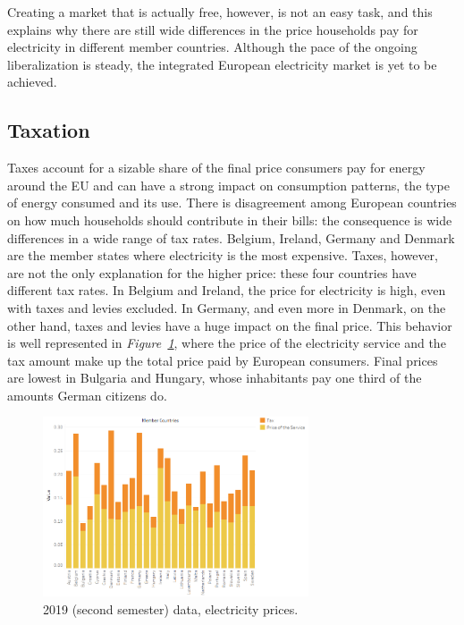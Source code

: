\documentclass[a4paper,12pt]{book}
\begin{document}
Creating a market that is actually free, however, is not an easy task, and this explains why there are still wide differences in the price households pay for electricity in different member countries. Although the pace of the ongoing liberalization is steady, the integrated European electricity market is yet to be achieved. \\

\subsection{Taxation}

Taxes account for a sizable share of the final price consumers pay for energy around the EU and can have a strong impact on consumption patterns, the type of energy consumed and its use. There is disagreement among European countries on how much households should contribute in their bills: the consequence is wide differences in a wide range of tax rates. Belgium, Ireland, Germany and Denmark are the member states where electricity is the most expensive. Taxes, however, are not the only explanation for the higher price: these four countries have different tax rates. In Belgium and Ireland, the price for electricity is high, even with taxes and levies excluded. In Germany, and even more in Denmark, on the other hand, taxes and levies have a huge impact on the final price. This behavior is well represented in \textit{Figure~\ref{fig:2019}}, where the price of the electricity service and the tax amount make up the total price paid by European consumers. Final prices are lowest in Bulgaria and Hungary, whose inhabitants pay one third of the amounts German citizens do. 

\begin{figure}[tb]
\begin{center}
\captionsetup{justification=centering}
\includegraphics[width=0.7\textwidth]{Images/Taxes.png}
\caption{2019 (second semester) data, electricity prices. }
\label{fig:2019}
\end{center}
\end{figure}
\end{document}
